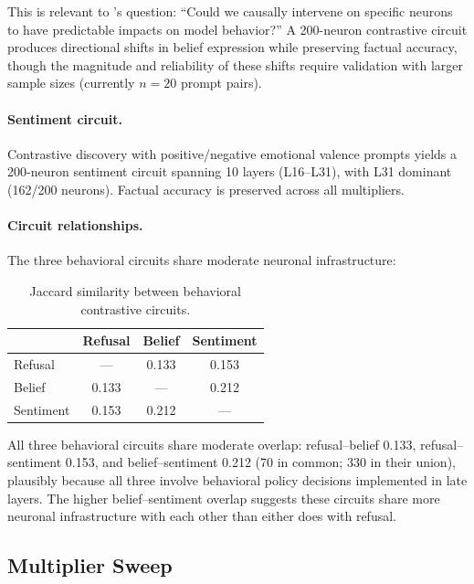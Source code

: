\documentclass[11pt]{article}
\begin{document}
This is relevant to \citet{chalnick2025goodfire}'s question: ``Could we causally intervene on specific neurons to have predictable impacts on model behavior?''
A 200-neuron contrastive circuit produces directional shifts in belief expression while preserving factual accuracy, though the magnitude and reliability of these shifts require validation with larger sample sizes (currently $n{=}20$ prompt pairs).

\paragraph{Sentiment circuit.}
Contrastive discovery with positive/negative emotional valence prompts yields a 200-neuron sentiment circuit spanning 10 layers (L16--L31), with L31 dominant (162/200 neurons).
Factual accuracy is preserved across all multipliers.

\paragraph{Circuit relationships.}
The three behavioral circuits share moderate neuronal infrastructure:

\begin{table}[h]
\centering
\caption{Jaccard similarity between behavioral contrastive circuits.}
\label{tab:behavioral_overlap}
\small
\begin{tabular}{lccc}
\toprule
& \textbf{Refusal} & \textbf{Belief} & \textbf{Sentiment} \\
\midrule
Refusal & --- & 0.133 & 0.153 \\
Belief & 0.133 & --- & 0.212 \\
Sentiment & 0.153 & 0.212 & --- \\
\bottomrule
\end{tabular}
\end{table}

All three behavioral circuits share moderate overlap: refusal--belief 0.133, refusal--sentiment 0.153, and belief--sentiment 0.212 (70 in common; 330 in their union), plausibly because all three involve behavioral policy decisions implemented in late layers.
The higher belief--sentiment overlap suggests these circuits share more neuronal infrastructure with each other than either does with refusal.

\subsection{Multiplier Sweep}
\label{sec:sweep}
\end{document}
